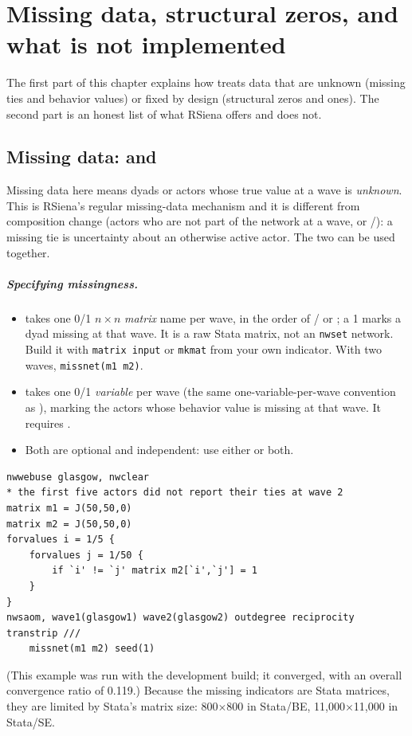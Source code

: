 \chapter{Missing data, structural zeros, and what is not implemented}\label{ch:missing}

The first part of this chapter explains how \nwsaom{} treats data that are unknown (missing ties and behavior values) or fixed by design (structural zeros and ones). The second part is an honest list of what RSiena offers and \nwsaom{} does not.

\section{Missing data:  and }\label{sec:missing}
Missing data here means dyads or actors whose true value at a wave is \emph{unknown}. This is RSiena's regular missing-data mechanism and it is different from composition change (actors who are not part of the network at a wave,  or /): a missing tie is uncertainty about an otherwise active actor. The two can be used together.

\paragraph{Specifying missingness.}
\begin{itemize}
\item {} takes one 0/1 $n\times n$ \emph{matrix} name per wave, in the order of / or ; a 1 marks a dyad missing at that wave. It is a raw Stata matrix, not an \texttt{nwset} network. Build it with \texttt{matrix input} or \texttt{mkmat} from your own indicator. With two waves, \texttt{missnet(m1 m2)}.
\item {} takes one 0/1 \emph{variable} per wave (the same one-variable-per-wave convention as ), marking the actors whose behavior value is missing at that wave. It requires .
\item Both are optional and independent: use either or both.
\end{itemize}
\begin{lstlisting}
nwwebuse glasgow, nwclear
* the first five actors did not report their ties at wave 2
matrix m1 = J(50,50,0)
matrix m2 = J(50,50,0)
forvalues i = 1/5 {
    forvalues j = 1/50 {
        if `i' != `j' matrix m2[`i',`j'] = 1
    }
}
nwsaom, wave1(glasgow1) wave2(glasgow2) outdegree reciprocity transtrip ///
    missnet(m1 m2) seed(1)
\end{lstlisting}
(This example was run with the development build; it converged, with an overall convergence ratio of 0.119.) Because the missing indicators are Stata matrices, they are limited by Stata's matrix size: 800$\times$800 in Stata/BE, 11,000$\times$11,000 in Stata/SE.

